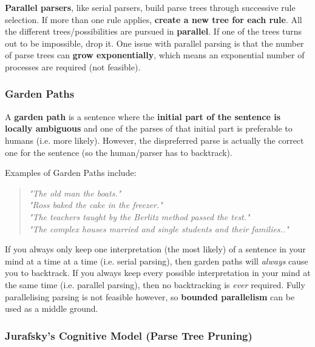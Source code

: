 \documentclass{article}
\begin{document}
\textbf{Parallel parsers}, like serial parsers, build parse trees through successive rule selection. If more than one rule applies, \textbf{create a new tree for each rule}. All the different trees/possibilities are pursued in \textbf{parallel}. If one of the trees turns out to be impossible, drop it. One issue with parallel parsing is that the number of parse trees can \textbf{grow exponentially}, which means an exponential number of processes are required (not feasible).

\subsubsection{Garden Paths}

A \textbf{garden path} is a sentence where the \textbf{initial part of the sentence is locally ambiguous} and one of the parses of that initial part is preferable to humans (i.e. more likely). However, the dispreferred parse is actually the correct one for the sentence (so the human/parser has to backtrack).

Examples of Garden Paths include:
\begin{quote}
	\textit{"The old man the boats."} \\
	\textit{"Ross baked the cake in the freezer."} \\
	\textit{"The teachers taught by the Berlitz method passed the test."} \\
	\textit{"The complex houses married and single students and their families.."} \\
\end{quote}

If you always only keep one interpretation (the most likely) of a sentence in your mind at a time at a time (i.e. serial parsing), then garden paths will \textit{always} cause you to backtrack. If you always keep every possible interpretation in your mind at the same time (i.e. parallel parsing), then no backtracking is \textit{ever} required. Fully parallelising parsing is not feasible however, so \textbf{bounded parallelism} can be used as a middle ground.

\subsubsection{Jurafsky's Cognitive Model (Parse Tree Pruning)}
\end{document}
